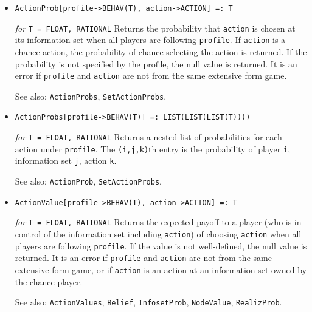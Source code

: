 \begin{itemize}



\item{}
\protect \large \begin{verbatim}
ActionProb[profile->BEHAV(T), action->ACTION] =: T
\end{verbatim}\normalsize

{\it for} {\tt T = FLOAT, RATIONAL}
\bd
Returns the probability that \verb+action+ is chosen at its
information set when all players are following \verb+profile+.
If \verb+action+ is a chance action, the probability of chance selecting
the action is returned.  If the probability is not specified by the 
profile, the null value is returned.  It is an error if \verb+profile+
and \verb+action+ are not from the same extensive form game.

\item [See also:] \verb+ActionProbs+, \verb+SetActionProbs+.
\ed

\item{}
\protect \large \begin{verbatim}
ActionProbs[profile->BEHAV(T)] =: LIST(LIST(LIST(T))))
\end{verbatim}\normalsize

{\it for} {\tt T = FLOAT, RATIONAL} 
\bd 
Returns a nested list of probabilities for each action under
\verb+profile+.  The \verb+(i,j,k)+th entry is the probability of
player \verb+i+, information set \verb+j+, action \verb+k+. 

\item [See also:] \verb+ActionProb+, \verb+SetActionProbs+.
\ed

\item{}
\protect \large \begin{verbatim}
ActionValue[profile->BEHAV(T), action->ACTION] =: T
\end{verbatim}\normalsize

{\it for} {\tt T = FLOAT, RATIONAL} 
\bd 
Returns the expected payoff to a player (who is in control of the
information set including \verb+action+) of choosing \verb+action+ when
all players are following \verb+profile+.  If the value is not
well-defined, the null value is returned.  It is an error if
\verb+profile+ and \verb+action+ are not from the same extensive form
game, or if \verb+action+ is an action at an information set owned by
the chance player.

\item [See also:] \verb+ActionValues+, \verb+Belief+,
\verb+InfosetProb+, \verb+NodeValue+, \verb+RealizProb+.  
\ed


\end{itemize}

